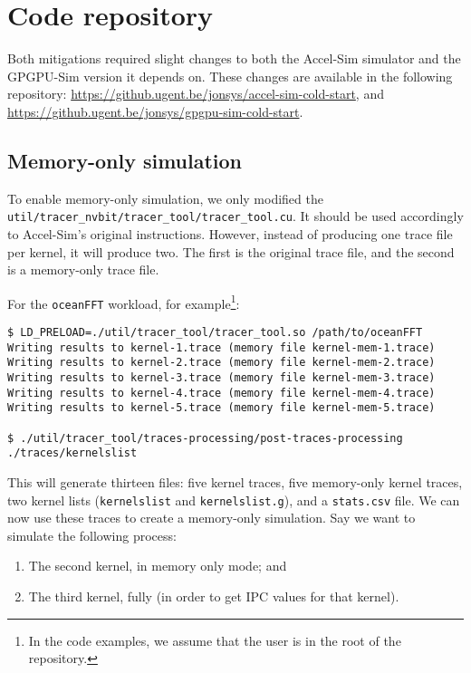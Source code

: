\chapter{Code repository}\label{ch:repo}
Both mitigations required slight changes to both the Accel-Sim simulator and the GPGPU-Sim version it depends on.
These changes are available in the following repository: \url{https://github.ugent.be/jonsys/accel-sim-cold-start}, and \url{https://github.ugent.be/jonsys/gpgpu-sim-cold-start}. %

\section{Memory-only simulation}\label{sec:repo-mem-only}
To enable memory-only simulation, we only modified the \verb|util/tracer_nvbit/tracer_tool/tracer_tool.cu|.
It should be used accordingly to Accel-Sim's original instructions.
However, instead of producing one trace file per kernel, it will produce two.
The first is the original trace file, and the second is a memory-only trace file.

For the \verb|oceanFFT| workload, for example\footnote{In the code examples, we assume that the user is in the root of the repository.}:
\begin{verbatim}
$ LD_PRELOAD=./util/tracer_tool/tracer_tool.so /path/to/oceanFFT
Writing results to kernel-1.trace (memory file kernel-mem-1.trace)
Writing results to kernel-2.trace (memory file kernel-mem-2.trace)
Writing results to kernel-3.trace (memory file kernel-mem-3.trace)
Writing results to kernel-4.trace (memory file kernel-mem-4.trace)
Writing results to kernel-5.trace (memory file kernel-mem-5.trace)

$ ./util/tracer_tool/traces-processing/post-traces-processing ./traces/kernelslist
\end{verbatim}

This will generate thirteen files: five kernel traces, five memory-only kernel traces, two kernel lists (\verb|kernelslist| and \verb|kernelslist.g|), and a \verb|stats.csv| file.
We can now use these traces to create a memory-only simulation.
Say we want to simulate the following process:
\begin{enumerate}
    \item The second kernel, in memory only mode; and
    \item The third kernel, fully (in order to get IPC values for that kernel).
\end{enumerate}

